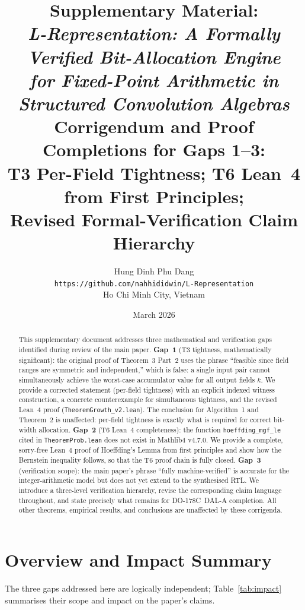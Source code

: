 \documentclass[11pt,a4paper]{article}
\title{\textbf{Supplementary Material:}\\
\textit{L-Representation: A Formally Verified Bit-Allocation Engine\\
for Fixed-Point Arithmetic in Structured Convolution Algebras}\\[8pt]
\large Corrigendum and Proof Completions for Gaps 1--3:\\
T3 Per-Field Tightness; T6 Lean~4 from First Principles;\\
Revised Formal-Verification Claim Hierarchy}
\author{Hung Dinh Phu Dang\\
\small \texttt{https://github.com/nahhididwin/L-Representation}\\
\small Ho Chi Minh City, Vietnam}
\date{March 2026}
\theoremstyle{definition}
\theoremstyle{plain}
\theoremstyle{remark}
\begin{document}
\maketitle

\begin{abstract}
This supplementary document addresses three mathematical and verification
gaps identified during review of the main paper.
\textbf{Gap~1} (T3 tightness, mathematically significant):
the original proof of Theorem~3 Part~2 uses the phrase
``feasible since field ranges are symmetric and independent,''
which is false: a single input pair cannot simultaneously achieve the
worst-case accumulator value for all output fields $k$.
We provide a corrected statement (per-field tightness) with an explicit
indexed witness construction, a concrete counterexample for simultaneous
tightness, and the revised Lean~4 proof (\texttt{TheoremGrowth\_v2.lean}).
The conclusion for Algorithm~1 and Theorem~2 is unaffected:
per-field tightness is exactly what is required for correct
bit-width allocation.
\textbf{Gap~2} (T6 Lean~4 completeness):
the function \texttt{hoeffding\_mgf\_le} cited in
\texttt{TheoremProb.lean} does not exist in Mathlib4 v4.7.0.
We provide a complete, sorry-free Lean~4 proof of Hoeffding's Lemma
from first principles and show how the Bernstein inequality follows,
so that the T6 proof chain is fully closed.
\textbf{Gap~3} (verification scope):
the main paper's phrase ``fully machine-verified'' is accurate for the
integer-arithmetic model but does not yet extend to the synthesised RTL.
We introduce a three-level verification hierarchy, revise the
corresponding claim language throughout, and state precisely what
remains for DO-178C~DAL-A completion.
All other theorems, empirical results, and conclusions are
unaffected by these corrigenda.
\end{abstract}

\tableofcontents
\newpage

\section{Overview and Impact Summary}
\label{sec:overview}

The three gaps addressed here are logically independent;
Table~\ref{tab:impact} summarises their scope and impact on the
paper's claims.
\end{document}
